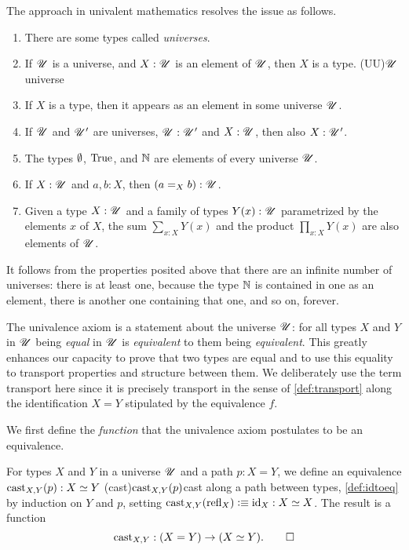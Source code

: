 The approach in univalent mathematics resolves the issue as follows.

\begin{enumerate}
\item There are some types called \emph{universes}.
\item If ${\mathscr{U}}$ is a universe, and $X : {\mathscr{U}}$ is an element of ${\mathscr{U}}$, then $X$ is a type.%
  \glossary(UU){$\protect{\mathscr{U}}$}{universe}
\item If $X$ is a type, then it appears as an element in some universe ${\mathscr{U}}$.
\item If ${\mathscr{U}}$ and ${\mathscr{U}}'$ are universes, ${\mathscr{U}}:{\mathscr{U}}'$ and $X:{\mathscr{U}}$, then also $X:{\mathscr{U}}'$.
\item The types $\emptyset$, $\mathrm{True}$, and $\mathbb{N}$ are elements of every universe ${\mathscr{U}}$.
\item If $X : {\mathscr{U}}$ and $a,b:X$, then $(a = _X b) : {\mathscr{U}}$.  
\item Given a type $X:{\mathscr{U}}$ and a family of types $Y(x):{\mathscr{U}}$ parametrized by the elements $x$ of $X$, the sum $\sum_{x:X} Y(x)$ and the product
  $\prod_{x:X} Y(x)$ are also elements of ${\mathscr{U}}$.
\end{enumerate}

It follows from the properties posited above that there are an infinite number of universes: there is at least one, because the type $\mathbb{N}$ is
contained in one as an element, there is another one containing that one, and so on, forever.

The univalence axiom is a statement about the universe ${\mathscr{U}}$: 
for all types $X$ and $Y$ in ${\mathscr{U}}$ being \emph{equal} in ${\mathscr{U}}$ is 
\emph{equivalent} to them being \emph{equivalent}. This greatly
enhances our capacity to prove that two types are equal
and to use this equality to transport properties and structure
between them. We deliberately use the term transport
here since it is precisely transport in the sense of
\cref{def:transport} along the identification
$X = Y$ stipulated by the equivalence $f$.

We first define the \emph{function} that
the univalence axiom postulates to be an equivalence.

\begin{definition}\label{def:idtoeq}
  For types $X$ and $Y$ in a universe ${\mathscr{U}}$ and a path $p : X = Y$,
  we define an equivalence $\cast_{X,Y} (p) : X\equiv Y$
  \glossary(cast){$\protect\cast_{X,Y} (p)$}{cast along a path between types, \cref{def:idtoeq}}
  by induction on $Y$ and $p$,
  setting $\cast_{X,Y} (\refl X) \defeq \id_X : X \equiv X$.
  The result is a function
  \[
    \cast_{X,Y} : (X = Y) \to (X\equiv Y).\qedhere
  \]
\end{definition}
  
